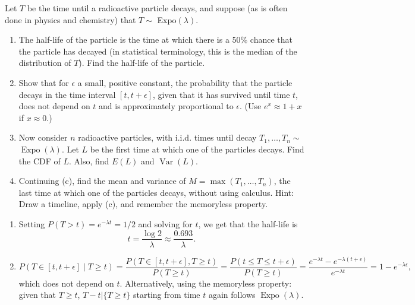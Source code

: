 

\setcounter{theorem}{36}
\begin{exercise}[BH.5.37] Let $T$ be the time until a radioactive particle decays, and suppose (as is often done in
	physics and chemistry) that $T\sim $   Expo$(\lambda)$.
	\begin{enumerate}
		\item  The half-life of the particle is the time at which there is a 50\% chance that the
		particle has decayed (in statistical terminology, this is the median of the distribution of
		$T$). Find the half-life of the particle.
		\item Show that for $\epsilon$ a small, positive constant, the probability that the particle decays in the time interval $[t, t+\epsilon]$, given that it has survived until time $t$, does not depend on $t$ and is approximately proportional to $\epsilon$. (Use $e^x \approx 1+x$ if $x \approx 0$.)
		\item Now consider $n$ radioactive particles, with i.i.d. times until decay $T_1, \ldots, T_n \sim$ $\operatorname{Expo}(\lambda)$. Let $L$ be the first time at which one of the particles decays. Find the CDF of $L$. Also, find $E(L)$ and $\operatorname{Var}(L)$.
		\item Continuing (c), find the mean and variance of $M=\max \left(T_1, \ldots, T_n\right)$, the last time at which one of the particles decays, without using calculus.
		Hint: Draw a timeline, apply (c), and remember the memoryless property.
	\end{enumerate} 
\begin{solution}
    \begin{enumerate}
        \item  Setting $P(T>t)=e^{-\lambda t}=1 / 2$ and solving for $t$, we get that the half-life is
        $$
        t=\frac{\log 2}{\lambda} \approx \frac{0.693}{\lambda} .
        $$
        \item  
        $$
        P(T \in[t, t+\epsilon] \mid T \geq t)=\frac{P(T \in[t, t+\epsilon], T \geq t)}{P(T \geq t)}=\frac{P(t \leq T \leq t+\epsilon)}{P(T \geq t)}=\frac{e^{-\lambda t}-e^{-\lambda(t+\epsilon)}}{e^{-\lambda t}}=1-e^{-\lambda \epsilon},
        $$
        which does not depend on $t$. Alternatively, using the memoryless property: given that $T \geq t$,  $T-t|\{T \geq t\}$ starting from time $t$ again follows $\operatorname{Expo}(\lambda)$.
        

\end{enumerate}
\end{solution}
\end{exercise}
